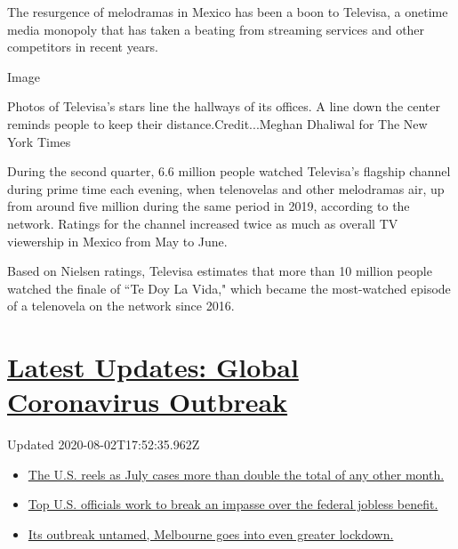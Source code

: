 The resurgence of melodramas in Mexico has been a boon to Televisa, a
onetime media monopoly that has taken a beating from streaming services
and other competitors in recent years.

Image

Photos of Televisa's stars line the hallways of its offices. A line down
the center reminds people to keep their distance.Credit...Meghan
Dhaliwal for The New York Times

During the second quarter, 6.6 million people watched Televisa's
flagship channel during prime time each evening, when telenovelas and
other melodramas air, up from around five million during the same period
in 2019, according to the network. Ratings for the channel increased
twice as much as overall TV viewership in Mexico from May to June.

Based on Nielsen ratings, Televisa estimates that more than 10 million
people watched the finale of ``Te Doy La Vida," which became the
most-watched episode of a telenovela on the network since 2016.

\hypertarget{latest-updates-global-coronavirus-outbreak}{%
\section{\texorpdfstring{\href{https://www.nytimes.com/2020/08/01/world/coronavirus-covid-19.html?action=click\&pgtype=Article\&state=default\&region=MAIN_CONTENT_1\&context=storylines_live_updates}{Latest
Updates: Global Coronavirus
Outbreak}}{Latest Updates: Global Coronavirus Outbreak}}\label{latest-updates-global-coronavirus-outbreak}}

Updated 2020-08-02T17:52:35.962Z

\begin{itemize}
\tightlist
\item
  \href{https://www.nytimes.com/2020/08/01/world/coronavirus-covid-19.html?action=click\&pgtype=Article\&state=default\&region=MAIN_CONTENT_1\&context=storylines_live_updates\#link-34047410}{The
  U.S. reels as July cases more than double the total of any other
  month.}
\item
  \href{https://www.nytimes.com/2020/08/01/world/coronavirus-covid-19.html?action=click\&pgtype=Article\&state=default\&region=MAIN_CONTENT_1\&context=storylines_live_updates\#link-780ec966}{Top
  U.S. officials work to break an impasse over the federal jobless
  benefit.}
\item
  \href{https://www.nytimes.com/2020/08/01/world/coronavirus-covid-19.html?action=click\&pgtype=Article\&state=default\&region=MAIN_CONTENT_1\&context=storylines_live_updates\#link-2bc8948}{Its
  outbreak untamed, Melbourne goes into even greater lockdown.}
\end{itemize}

